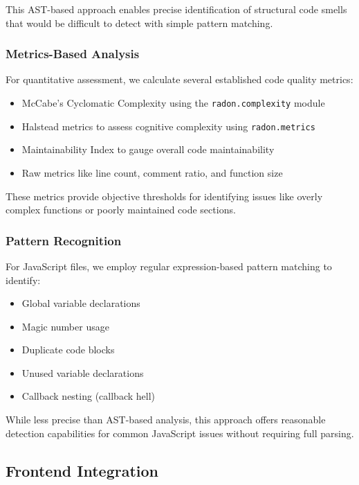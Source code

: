 \documentclass[sigconf,screen]{acmart}
\begin{document}
This AST-based approach enables precise identification of structural code smells that would be difficult to detect with simple pattern matching.

\subsubsection{Metrics-Based Analysis}

For quantitative assessment, we calculate several established code quality metrics:

\begin{itemize}
    \item McCabe's Cyclomatic Complexity using the \texttt{radon.complexity} module
    \item Halstead metrics to assess cognitive complexity using \texttt{radon.metrics}
    \item Maintainability Index to gauge overall code maintainability
    \item Raw metrics like line count, comment ratio, and function size
\end{itemize}

These metrics provide objective thresholds for identifying issues like overly complex functions or poorly maintained code sections.

\subsubsection{Pattern Recognition}

For JavaScript files, we employ regular expression-based pattern matching to identify:

\begin{itemize}
    \item Global variable declarations
    \item Magic number usage
    \item Duplicate code blocks
    \item Unused variable declarations
    \item Callback nesting (callback hell)
\end{itemize}

While less precise than AST-based analysis, this approach offers reasonable detection capabilities for common JavaScript issues without requiring full parsing.

\subsection{Frontend Integration}
\end{document}
